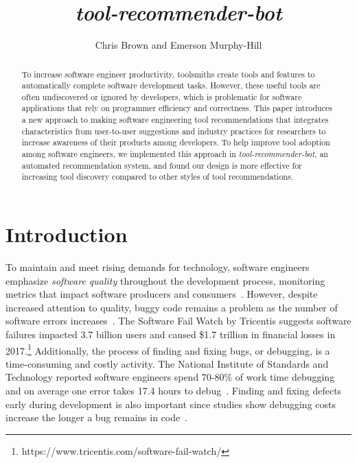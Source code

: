 \documentclass[sigconf,review,anonymous]{acmart}
\newcommand{\tool}{\textsl{tool-recommender-bot}}
\begin{document}

\title{\tool}

\author{Chris Brown and Emerson Murphy-Hill}

\begin{abstract}
To increase software engineer productivity, toolsmiths create tools and features to automatically complete software development tasks. However, these useful tools are often undiscovered or ignored by developers, which is problematic for software applications that rely on programmer efficiency and correctness. This paper introduces a new approach to making software engineering tool recommendations that integrates characteristics from user-to-user suggestions and industry practices for researchers to increase awareness of their products among developers. To help improve tool adoption among software engineers, we implemented this approach in \tool, an automated recommendation system, and found our design is more effective for increasing tool discovery compared to other styles of tool recommendations.
\end{abstract}

\maketitle

\section{Introduction}

To maintain and meet rising demands for technology, software engineers emphasize \textit{software quality} throughout the development process, monitoring metrics that impact software producers and consumers~\cite{KitchenhamQualityTarget}. However, despite increased attention to quality, buggy code remains a problem as the number of software errors increases~\cite{HaveThingsChanged}. The Software Fail Watch by Tricentis suggests software failures impacted 3.7 billion users and caused \$1.7 trillion in financial losses in 2017.\footnote{https://www.tricentis.com/software-fail-watch/} Additionally, the process of finding and fixing bugs, or debugging, is a time-consuming and costly activity. The National Institute of Standards and Technology reported software engineers spend 70-80\% of work time debugging and on average one error takes 17.4 hours to debug~\cite{NIST}. Finding and fixing defects early during development is also important since studies show debugging costs increase the longer a bug remains in code~\cite{SEEconomics, SoftwareAssuranceSDLC}.
\end{document}
